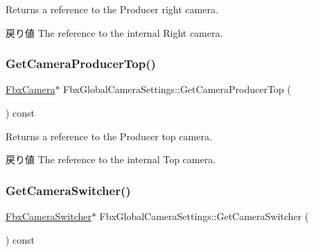 Returns a reference to the Producer right camera. \begin{DoxyReturn}{戻り値}
The reference to the internal Right camera. 
\end{DoxyReturn}
\mbox{\label{class_fbx_global_camera_settings_a24d688c9385c1393c552bd05e124f104}} 
\subsubsection{\texorpdfstring{Get\+Camera\+Producer\+Top()}{GetCameraProducerTop()}}
{\footnotesize\ttfamily \hyperlink{class_fbx_camera}{Fbx\+Camera}$\ast$ Fbx\+Global\+Camera\+Settings\+::\+Get\+Camera\+Producer\+Top (\begin{DoxyParamCaption}{ }\end{DoxyParamCaption}) const}

Returns a reference to the Producer top camera. \begin{DoxyReturn}{戻り値}
The reference to the internal Top camera. 
\end{DoxyReturn}
\mbox{\label{class_fbx_global_camera_settings_ab581e270145dfa36b239171811cc35b9}} 
\subsubsection{\texorpdfstring{Get\+Camera\+Switcher()}{GetCameraSwitcher()}}
{\footnotesize\ttfamily \hyperlink{class_fbx_camera_switcher}{Fbx\+Camera\+Switcher}$\ast$ Fbx\+Global\+Camera\+Settings\+::\+Get\+Camera\+Switcher (\begin{DoxyParamCaption}{ }\end{DoxyParamCaption}) const}

